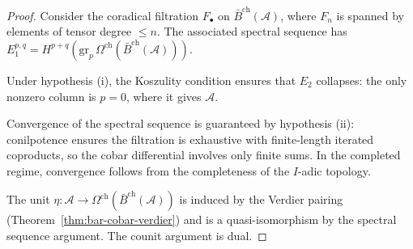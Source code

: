 \begin{proof}
Consider the coradical filtration $F_\bullet$ on
$\bar{B}^{\mathrm{ch}}(\mathcal{A})$, where $F_n$ is spanned by elements
of tensor degree $\leq n$.  The associated spectral sequence has
$E_1^{p,q} = H^{p+q}(\mathrm{gr}_p\, \Omega^{\mathrm{ch}}(\bar{B}^{\mathrm{ch}}(\mathcal{A})))$.

Under hypothesis (i), the Koszulity condition ensures that $E_2$ collapses:
the only nonzero column is $p = 0$, where it gives $\mathcal{A}$.

Convergence of the spectral sequence is guaranteed by hypothesis (ii):
conilpotence ensures the filtration is exhaustive with finite-length iterated
coproducts, so the cobar differential involves only finite sums.  In the
completed regime, convergence follows from the completeness of the
$I$-adic topology.

The unit $\eta: \mathcal{A} \to \Omega^{\mathrm{ch}}(\bar{B}^{\mathrm{ch}}(\mathcal{A}))$
is induced by the Verdier pairing (Theorem~\ref{thm:bar-cobar-verdier})
and is a quasi-isomorphism by the spectral sequence argument.
The counit argument is dual.
\end{proof}

